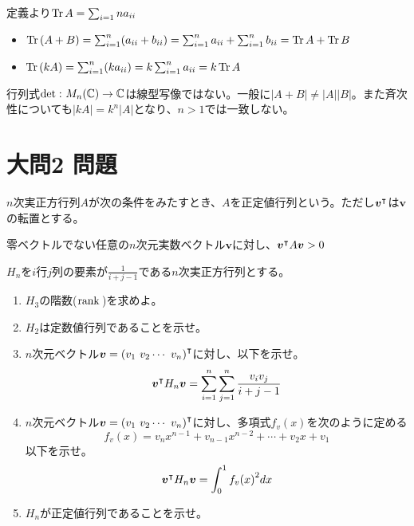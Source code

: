 \documentclass[dvipdfmx]{jsreport}
\begin{document}
\begin{souanswer}
\begin{enumerate}
\begin{enumerate_alpha}
	定義より$\operatorname{Tr}{A}= \sum_{i= 1}n a_{ii}$
\begin{itemize}
	\item $\operatorname{Tr}{(A+ B)}= \sum_{i= 1}^n(a_{ii}+ b_{ii})= \sum_{i= 1}^n a_{ii}+ \sum_{i= 1}^n b_{ii}= \operatorname{Tr}{A}+ \operatorname{Tr}{B}$
	\item $\operatorname{Tr}{(kA)}= \sum_{i= 1}^n (ka_{ii})=k\sum_{i= 1}^n a_{ii}= k\operatorname{Tr}{A}$
\end{itemize}
	\item 行列式$\det{}\colon M_n(\mathbb{C})\to \mathbb{C}$は線型写像ではない。一般に$|A+ B|\ne |A||B|$。また斉次性についても$|kA|= k^n|A|$となり、$n> 1$では一致しない。
\end{enumerate_alpha}
\end{enumerate}
\end{souanswer}
\section{大問2 問題}
\begin{tcolorbox} %
	$n$次実正方行列$A$が次の条件をみたすとき、$A$を正定値行列という。ただし${\bm{v}}^\intercal$は$\bm{v}$の転置とする。
\begin{tcolorbox}
	零ベクトルでない任意の$n$次元実数ベクトル$\bm{v}$に対し、${\bm{v}}^\intercal A\bm{v}> 0$
\end{tcolorbox}
	$H_n$を$i$行$j$列の要素が$\frac{1}{i+ j- 1}$である$n$次実正方行列とする。
\begin{enumerate}
	\item $H_3$の階数($\operatorname{rank}{}$)を求めよ。
	\item $H_2$は定数値行列であることを示せ。
	\item $n$次元ベクトル$\bm{v}= \tr{(v_1\ v_2\cdots\ v_n)}$に対し、以下を示せ。
\begin{equation*}
	{\bm{v}}^\intercal H_n\bm{v}= \sum_{i= 1}^n\sum_{j= 1}^n \frac{v_i v_j}{i+ j-1}
\end{equation*}
	\item $n$次元ベクトル$\bm{v}= \tr{(v_1\ v_2\cdots\ v_n)}$に対し、多項式$f_v(x)$を次のように定める
\begin{equation*}
	f_v(x)= v_n x^{n-1}+ v_{n- 1} x^{n- 2}+ \cdots+ v_2 x+ v_1
\end{equation*}
	以下を示せ。
\begin{equation*}
	{\bm{v}}^\intercal H_n\bm{v}= \int_0^1 {f_v(x)}^2 dx
\end{equation*}
	\item $H_n$が正定値行列であることを示せ。
\end{enumerate}
\end{tcolorbox}
\end{document}

